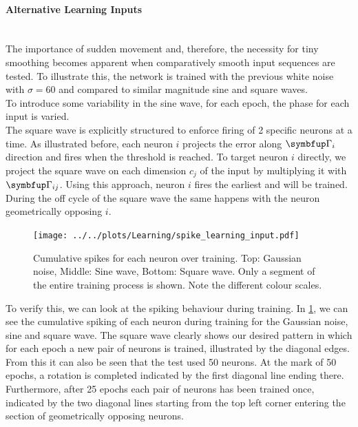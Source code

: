 \paragraph{Alternative Learning Inputs}\mbox{}\\
The importance of sudden movement and, therefore, the necessity for tiny smoothing becomes apparent when comparatively smooth input sequences are tested. To illustrate this, the network is trained with the previous white noise with $\sigma = 60$ and compared to similar magnitude sine and square waves.\\
To introduce some variability in the sine wave, for each epoch, the phase for each input is varied.\\
The square wave is explicitly structured to enforce firing of 2 specific neurons at a time. As illustrated before, each neuron $i$ projects the error along $\bmu{\Gamma}_i$ direction and fires when the threshold is reached. To target neuron $i$ directly, we project the square wave on each dimension $c_j$ of the input by multiplying it with $\bmu{\Gamma}_{ij}$. Using this approach, neuron $i$ fires the earliest and will be trained. During the off cycle of the square wave the same happens with the neuron geometrically opposing $i$.\\
\begin{figure}
	\centering
	\texttt{[image: ../../plots/Learning/spike\_learning\_input.pdf]}
	\caption{Cumulative spikes for each neuron over training. Top: Gaussian noise, Middle: Sine wave, Bottom: Square wave. Only a segment of the entire training process is shown. Note the different colour scales.}
	\label{fig:spike_learning_input}
\end{figure}
To verify this, we can look at the spiking behaviour during training. In \cref{fig:spike_learning_input}, we can see the cumulative spiking of each neuron during training for the Gaussian noise, sine and square wave. The square wave clearly shows our desired pattern in which for each epoch a new pair of neurons is trained, illustrated by the diagonal edges. From this it can also be seen that the test used 50 neurons. At the mark of 50 epochs, a rotation is completed indicated by the first diagonal line ending there. Furthermore, after 25 epochs each pair of neurons has been trained once, indicated by the two diagonal lines starting from the top left corner entering the section of geometrically opposing neurons.\\
